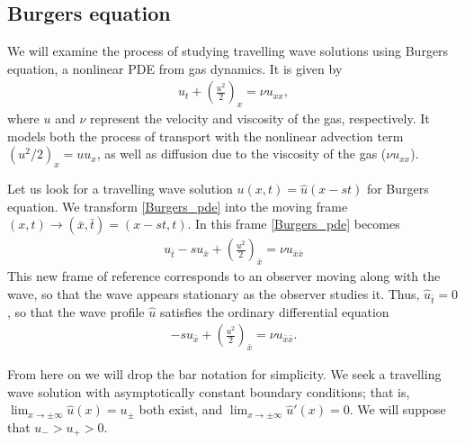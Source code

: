 \subsection*{Burgers equation}
We will examine the process of studying travelling wave solutions using Burgers equation, a nonlinear PDE from gas dynamics.
It is given by
\begin{align}
	u_t + \left( \frac{u^2}{2} \right)_x = \nu u_{xx}, \label{Burgers_pde}
\end{align}
where $u$ and $\nu$ represent the velocity and viscosity of the gas, respectively.
It models both the process of transport with the nonlinear advection term $(u^2/2)_x = u u_x$, as well as diffusion due to the viscosity of the gas ($\nu u_{xx}$).

Let us look for a travelling wave solution $u(x,t) = \hat{u}(x-st)$ for Burgers equation.
We transform \eqref{Burgers_pde} into the moving frame $(x,t) \to (\bar{x},\bar{t}) = (x-st, t)$. In this frame \eqref{Burgers_pde} becomes
\begin{align}
	u_{\bar{t}} - s u_{\bar{x}}+ \left(\frac{u^2}{2} \right)_{\bar{x}} = \nu u_{\bar{x}\bar{x}}
	\label{Burgers_pde_moving_frame}
\end{align}
This new frame of reference corresponds to an observer moving along with the wave, so that the wave appears stationary as the observer studies it.
Thus, $\hat{u}_{\bar{t}} = 0$, so that the wave profile $\hat{u}$ satisfies the ordinary differential equation
\begin{align}
	 -s u_{\bar{x}}+ \left(\frac{u^2}{2} \right)_{\bar{x}} = \nu u_{\bar{x}\bar{x}}. \label{Burgers_ode}
\end{align}

From here on we will drop the bar notation for simplicity.
We seek a travelling wave solution with asymptotically constant boundary conditions; that is,  $\lim_{x \to \pm \infty}\hat{u}(x) = u_{\pm}$
both exist, and  $\lim_{x \to \pm \infty} \hat{u}'(x) = 0$.
We will suppose that $u_- > u_+ > 0$.


